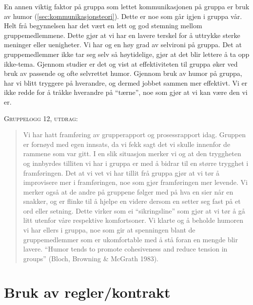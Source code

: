 En annen viktig faktor på gruppa som lettet kommunikasjonen på gruppa er bruk
av humor (\ref{sec:kommunikasjonsteori}). Dette er noe
som går igjen i gruppa vår. Helt frå begynnelsen har det vært en lett og god stemning mellom gruppemedlemmene. 
Dette gjør at vi har en lavere terskel for å uttrykke sterke meninger eller uenigheter. Vi har og en høy grad 
av selvironi på gruppa. Det at gruppemedlemmer ikke tar seg selv så høytidelige, gjør at det blir lettere å ta 
opp ikke-tema. Gjennom studier er det og vist at effektiviteten til gruppa øker ved bruk av passende og ofte 
selvrettet humor. Gjennom bruk av humor på gruppa, har vi blitt tryggere på hverandre, og dermed jobbet sammen 
mer effektivt. Vi er ikke redde for å tråkke hverandre på ``tærne'', noe som gjør at vi kan være den vi er. 


\begin{centering}
\textsc{Gruppelogg 12, utdrag:}
\end{centering}
\begin{quote}
Vi har hatt framføring av grupperapport og prosessrapport idag. Gruppen er fornøyd med egen innsats, da 
vi fekk sagt det vi skulle innenfor de rammene som var gitt. I en slik situasjon merker vi og at den 
tryggheten og innbyrdes tilliten vi har i gruppa er med å bidrar til en større trygghet i framføringen. 
Det at vi vet vi har tillit frå gruppa gjør at vi tør å improvisere mer i framføringen, noe som gjør 
framføringen mer levende. Vi merker også at de andre på gruppene følger med på hva en sier når en snakker, 
og er flinke til å hjelpe en videre dersom en setter seg fast på et ord eller setning. Dette virker som 
ei ``sikringsline'' som gjør at vi tør å gå litt utenfor våre respektive komfortsoner. Vi klarte og å beholde 
humoren vi har ellers i gruppa, noe som gir at spenningen blant de gruppemedlemmer som er ukomfortable 
med å stå foran en mengde blir lavere. ``Humor tends to promote cohesiveness and reduce tension in groups'' 
(Bloch, Browning \& McGrath 1983).
\end{quote}



\section{Bruk av regler/kontrakt}

